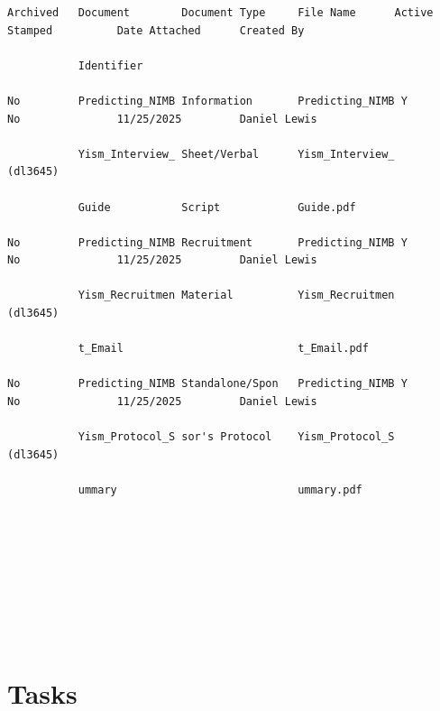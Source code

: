 \documentclass[10pt, letterpaper]{article}
\begin{document}
{\footnotesize

\begin{verbatim}





Archived   Document        Document Type     File Name      Active            Stamped          Date Attached      Created By

           Identifier

No         Predicting_NIMB Information       Predicting_NIMB Y                No               11/25/2025         Daniel Lewis

           Yism_Interview_ Sheet/Verbal      Yism_Interview_                                                      (dl3645)

           Guide           Script            Guide.pdf

No         Predicting_NIMB Recruitment       Predicting_NIMB Y                No               11/25/2025         Daniel Lewis

           Yism_Recruitmen Material          Yism_Recruitmen                                                      (dl3645)

           t_Email                           t_Email.pdf

No         Predicting_NIMB Standalone/Spon   Predicting_NIMB Y                No               11/25/2025         Daniel Lewis

           Yism_Protocol_S sor's Protocol    Yism_Protocol_S                                                      (dl3645)

           ummary                            ummary.pdf









\end{verbatim}

}

\section*{Tasks}

\vspace{0.5em}

\vspace{0.5em}

\vspace{0.5em}

\vspace{0.5em}

\vspace{0.5em}

\vspace{0.5em}
\end{document}
